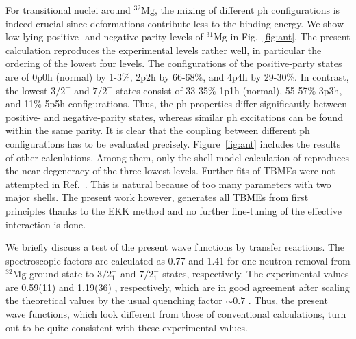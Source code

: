 \documentclass[aps,prl,twocolumn,groupedaddress,showkeys,showpacs,floatfix,superscriptaddress]{revtex4-1}
\def\Nu#1#2#3{{}^{#2}_{#3}\mathrm{#1}}
\newcommand\+{^\dagger}
\begin{document}
For transitional nuclei around $\Nu{Mg}{32}{}$, the mixing of different ph configurations is indeed crucial since deformations contribute less 
to the  binding energy.  
We show low-lying positive- and negative-parity levels of $\Nu{Mg}{31}{}$ in Fig.~\ref{fig:ant}.
The present calculation reproduces the experimental levels rather well, in particular  
the ordering of the lowest four levels.
The configurations of the positive-party states are of 0p0h (normal) by 1-3$\%$, 
2p2h by 66-68$\%$, and 4p4h by 29-30$\%$.  
In contrast, the lowest $3/2^{-}$ and $7/2^{-}$ states consist  of 
33-35$\%$ 1p1h (normal), 55-57$\%$ 3p3h, and 11$\%$ 5p5h configurations.
Thus, the ph properties differ significantly between positive- and negative-parity states, 
whereas similar ph excitations can be found within the same parity.  
It is clear that the coupling between different ph configurations has to be evaluated precisely.  
Figure~\ref{fig:ant} includes the results of other calculations.  Among them, only 
the shell-model calculation of \cite{Caurier:2013aoa} reproduces the near-degeneracy of
the three lowest levels. Further fits of TBMEs were not attempted in Ref.~\cite{Caurier:2013aoa}.     
This is natural because of too many parameters with two major shells. The present work however,   
generates all TBMEs from first principles thanks to the EKK method and no further fine-tuning of the effective interaction is done.

We briefly discuss a test of the present wave functions by transfer reactions.
The spectroscopic factors are calculated as 0.77 and 1.41 for one-neutron
removal from $\Nu{Mg}{32}{}$ ground state to $3/2^{-}_1$ and $7/2^{-}_1$ states, respectively.
The experimental values are 0.59(11) and 1.19(36) \cite{terry}, respectively, which are in good 
agreement after scaling the theoretical values by the usual quenching factor $\sim 0.7$ \cite{gadeSF,gadeSF2}.
Thus, the present wave functions, which look different from those of conventional calculations, 
turn out to be quite consistent with these experimental values.
  
\end{document}
